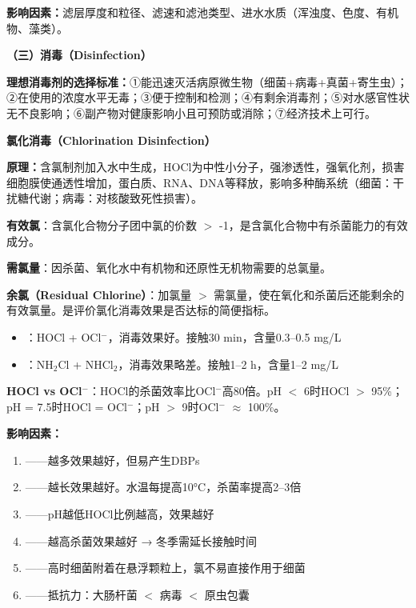 \begin{keybox}
\textbf{影响因素：}滤层厚度和粒径、滤速和滤池类型、进水水质（浑浊度、色度、有机物、藻类）。

\textbf{（三）消毒（Disinfection）}

\textbf{理想消毒剂的选择标准：}①能迅速灭活病原微生物（细菌+病毒+真菌+寄生虫）；②在使用的浓度水平无毒；③便于控制和检测；④有剩余消毒剂；⑤对水感官性状无不良影响；⑥副产物对健康影响小且可预防或消除；⑦经济技术上可行。

\textbf{氯化消毒（Chlorination Disinfection）}

\textbf{原理：}含氯制剂加入水中生成，HOCl为中性小分子，强渗透性，强氧化剂，损害细胞膜使通透性增加，蛋白质、RNA、DNA等释放，影响多种酶系统（细菌：干扰糖代谢；病毒：对核酸致死性损害）。

\begin{defbox}
\textbf{有效氯}：含氯化合物分子团中氯的价数 $>$ -1，是含氯化合物中有杀菌能力的有效成分。

\textbf{需氯量}：因杀菌、氧化水中有机物和还原性无机物需要的总氯量。

\textbf{余氯（Residual Chlorine）}：加氯量 $>$ 需氯量，使在氧化和杀菌后还能剩余的有效氯量。是评价氯化消毒效果是否达标的简便指标。
\begin{itemize}
    \item {}：HOCl + OCl$^-$，消毒效果好。接触30 min，含量0.3--0.5 mg/L
    \item {}：NH$_2$Cl + NHCl$_2$，消毒效果略差。接触1--2 h，含量1--2 mg/L
\end{itemize}
\end{defbox}

\textbf{HOCl vs OCl$^-$}：HOCl的杀菌效率比OCl$^-$高80倍。pH $<$ 6时HOCl $>$ 95\%；pH = 7.5时HOCl = OCl$^-$；pH $>$ 9时OCl$^-$ $\approx$ 100\%。

\textbf{影响因素：}
\begin{enumerate}[leftmargin=*]
    \item {}——越多效果越好，但易产生DBPs
    \item {}——越长效果越好。水温每提高10°C，杀菌率提高2--3倍
    \item {}——pH越低HOCl比例越高，效果越好
    \item {}——越高杀菌效果越好 → 冬季需延长接触时间
    \item {}——高时细菌附着在悬浮颗粒上，氯不易直接作用于细菌
    \item {}——抵抗力：大肠杆菌 $<$ 病毒 $<$ 原虫包囊
\end{enumerate}


\end{keybox}
